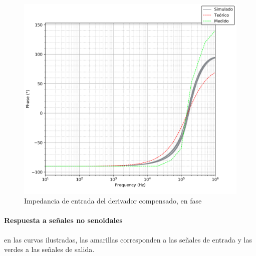 \begin{figure}[H]
	\centering
	\includegraphics[scale=0.7]{../EJ4/Recursos/Derivador_compensado/impedancia_fase.png}
	\caption{Impedancia de entrada del derivador compensado, en fase}
	\label{fig_derivador_compensado_impedancia_fase}
\end{figure}

\paragraph*{Respuesta a se\~nales no senoidales} en las curvas ilustradas, las amarillas corresponden a las se\~nales de entrada y las verdes
a las se\~nales de salida.


